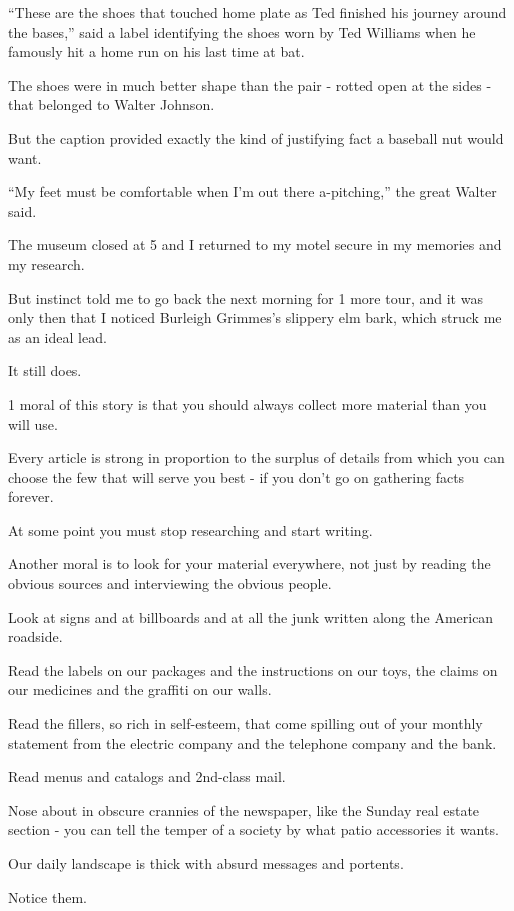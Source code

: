 \documentclass{book}
\numberwithin{equation}{section}
\begin{document}
%
``These are the shoes that touched home plate as Ted finished his journey around the bases,'' said a label identifying the shoes worn by Ted Williams when he famously hit a home run on his last time at bat.

The shoes were in much better shape than the pair - rotted open at the sides - that belonged to Walter Johnson.

But the caption provided exactly the kind of justifying fact a baseball nut would want.

``My feet must be comfortable when I'm out there a-pitching,'' the great Walter said.

%
The museum closed at 5 and I returned to my motel secure in my memories and my research.

But instinct told me to go back the next morning for 1 more tour, and it was only then that I noticed Burleigh Grimmes's slippery elm bark, which struck me as an ideal lead.

It still does.

1 moral of this story is that you should always collect more material than you will use.

Every article is strong in proportion to the surplus of details from which you can choose the few that will serve you best - if you don't go on gathering facts forever.

At some point you must stop researching and start writing.

%
Another moral is to look for your material everywhere, not just by reading the obvious sources and interviewing the obvious people.

Look at signs and at billboards and at all the junk written along the American roadside.

Read the labels on our packages and the instructions on our toys, the claims on our medicines and the graffiti on our walls.

Read the fillers, so rich in self-esteem, that come spilling out of your monthly statement from the electric company and the telephone company and the bank.

Read menus and catalogs and 2nd-class mail.

Nose about in obscure crannies of the newspaper, like the Sunday real estate section - you can tell the temper of a society by what patio accessories it wants.

Our daily landscape is thick with absurd messages and portents.

Notice them.
\end{document}
